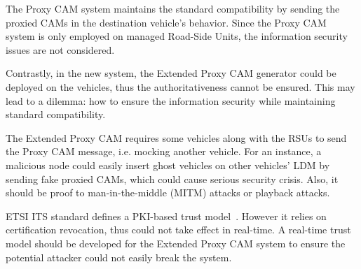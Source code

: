 The Proxy CAM system maintains the standard compatibility by sending the proxied CAMs in the destination vehicle's behavior.
Since the Proxy CAM system is only employed on managed Road-Side Units, the information security issues are not considered.

Contrastly, in the new system, the Extended Proxy CAM generator could be deployed on the vehicles, thus the authoritativeness cannot be ensured.
This may lead to a dilemma: how to ensure the information security while maintaining standard compatibility.

The Extended Proxy CAM requires some vehicles along with the RSUs to send the Proxy CAM message, i.e. mocking another vehicle.
For an instance, a malicious node could easily insert ghost vehicles on other vehicles' LDM by sending fake proxied CAMs, which could cause serious security crisis.
Also, it should be proof to man-in-the-middle (MITM) attacks or playback attacks.

ETSI ITS standard defines a PKI-based trust model~\cite{etsi2013103}. However it relies on certification revocation, thus could not take effect in real-time.
A real-time trust model should be developed for the Extended Proxy CAM system to ensure the potential attacker could not easily break the system.
